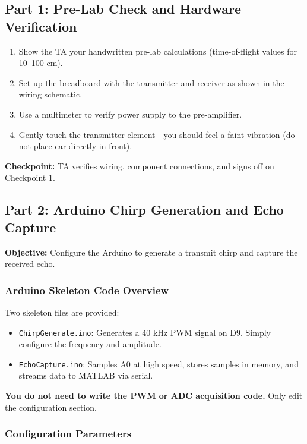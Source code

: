 \documentclass[11pt,letterpaper]{article}
\providecommand{\cpECE}[1]{\textcolor{OliveGreen}{\textbf{Checkpoint:} #1}}
\begin{document}
\subsection{Part 1: Pre-Lab Check and Hardware Verification}

\begin{enumerate}
    \item Show the TA your handwritten pre-lab calculations (time-of-flight values for 10--100 cm).
    \item Set up the breadboard with the transmitter and receiver as shown in the wiring schematic.
    \item Use a multimeter to verify power supply to the pre-amplifier.
    \item Gently touch the transmitter element—you should feel a faint vibration (do not place ear directly in front).
\end{enumerate}

\cpECE{TA verifies wiring, component connections, and signs off on Checkpoint 1.}

\subsection{Part 2: Arduino Chirp Generation and Echo Capture}

\textbf{Objective:} Configure the Arduino to generate a transmit chirp and capture the received echo.

\subsubsection*{Arduino Skeleton Code Overview}

Two skeleton files are provided:

\begin{itemize}
    \item \texttt{ChirpGenerate.ino}: Generates a 40 kHz PWM signal on D9. Simply configure the frequency and amplitude.
    \item \texttt{EchoCapture.ino}: Samples A0 at high speed, stores samples in memory, and streams data to MATLAB via serial.
\end{itemize}

\noindent
\textbf{You do not need to write the PWM or ADC acquisition code.} Only edit the configuration section.

\subsubsection*{Configuration Parameters}
\end{document}

